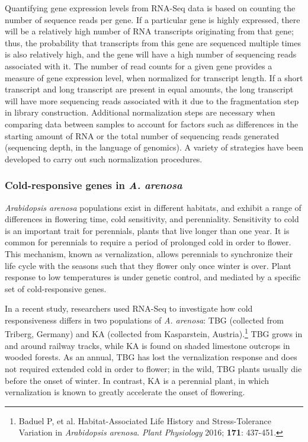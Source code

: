 \textD{\newpage}

Quantifying gene expression levels from RNA-Seq data is based on counting the number of sequence reads per gene. If a particular gene is highly expressed, there will be a relatively high number of RNA transcripts originating from that gene; thus, the probability that transcripts from this gene are sequenced multiple times is also relatively high, and the gene will have a high number of sequencing reads associated with it. The number of read counts for a given gene provides a measure of gene expression level, when normalized for transcript length. If a short transcript and long transcript are present in equal amounts, the long transcript will have more sequencing reads associated with it due to the fragmentation step in library construction. Additional normalization steps are necessary when comparing data between samples to account for factors such as differences in the starting amount of RNA or the total number of sequencing reads generated (sequencing depth, in the language of genomics). A variety of strategies have been developed to carry out such normalization procedures.

\subsubsection{Cold-responsive genes in \textit{A. arenosa}}

\textit{Arabidopsis arenosa} populations exist in different habitats, and exhibit a range of differences in flowering time, cold sensitivity, and perenniality. Sensitivity to cold is an important trait for perennials, plants that live longer than one year. It is common for perennials to require a period of prolonged cold in order to flower. This mechanism, known as vernalization, allows perennials to synchronize their life cycle with the seasons such that they flower only once winter is over. Plant response to low temperatures is under genetic control, and mediated by a specific set of cold-responsive genes.

In a recent study, researchers used RNA-Seq to investigate how cold responsiveness differs in two populations of \textit{A. arenosa}: TBG (collected from Triberg, Germany) and KA (collected from Kasparstein, Austria).\footnote{Baduel P, et al. Habitat-Associated Life History and Stress-Tolerance Variation in \textit{Arabidopsis arenosa}. \textit{Plant Physiology} 2016; \textbf{171}: 437-451.} TBG grows in and around railway tracks, while KA is found on shaded limestone outcrops in wooded forests. As an annual, TBG has lost the vernalization response and does not required extended cold in order to flower; in the wild, TBG plants usually die before the onset of winter. In contrast, KA is a perennial plant, in which vernalization is known to greatly accelerate the onset of flowering.

